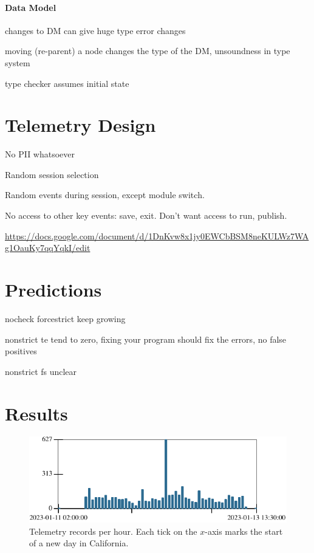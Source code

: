 \documentclass[
  acmsmall,
  review,
  anonymous,
]{acmart}
\begin{document}
\paragraph{Data Model}

changes to DM can give huge type error changes

moving (re-parent) a node changes the type of the DM, unsoundness in type system

type checker assumes initial state


\section{Telemetry Design}

No PII whatsoever

Random session selection

Random events during session, except module switch.

No access to other key events: save, exit.
Don't want access to run, publish.

\url{https://docs.google.com/document/d/1DnKvw8x1jy0EWCbBSM8neKULWz7WAg1OauKy7qqYqkI/edit}


\section{Predictions}

nocheck forcestrict keep growing

nonstrict te tend to zero, fixing your program should fix the errors, no false positives

nonstrict fs unclear


\section{Results}
\label{s:data}

\begin{figure}[t]
  \includegraphics{img/row-distribution.pdf}
  \caption{Telemetry records per hour. Each tick on the $x$-axis marks the start of a new day in California.}
  \label{f:records-per-hour}
\end{figure}
\end{document}
